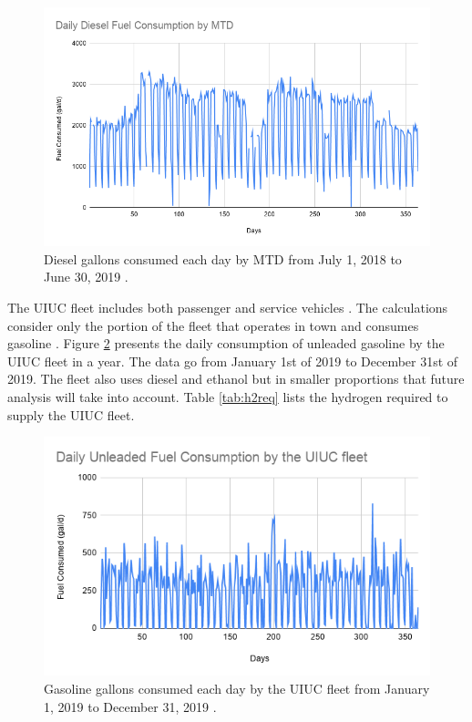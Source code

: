 \documentclass{anstrans}
\begin{document}
\begin{figure}[H]
	\centering
	\includegraphics[width=1.05\linewidth]{figures/mtd-fuel-consumption.png}
	\hfill
	\caption{Diesel gallons consumed each day by MTD from July 1, 2018 to June 30, 2019 \cite{mtd_irecords_2019}.}
	\label{fig:mtdfuel}
\end{figure}

The UIUC fleet includes both passenger and service vehicles \cite{uiuc_institute_for_sustainability_energy_and_environment_increase_2020}. The calculations consider only the portion of the fleet that operates in town and consumes gasoline \cite{uiuc_personnal_communication}. Figure \ref{fig:uiucfuel} presents the daily consumption of unleaded gasoline by the UIUC fleet in a year. The data go from January 1st of 2019 to December 31st of 2019. The fleet also uses diesel and ethanol but in smaller proportions that future analysis will take into account.
Table \ref{tab:h2req} lists the hydrogen required to supply the UIUC fleet.

\begin{figure}[H]
	\centering
	\includegraphics[width=0.95\linewidth]{figures/uiuc-unleaded.png}
	\hfill
	\caption{Gasoline gallons consumed each day by the UIUC fleet from January 1, 2019 to December 31, 2019 \cite{uiuc_personnal_communication}.}
	\label{fig:uiucfuel}
\end{figure}
\end{document}
